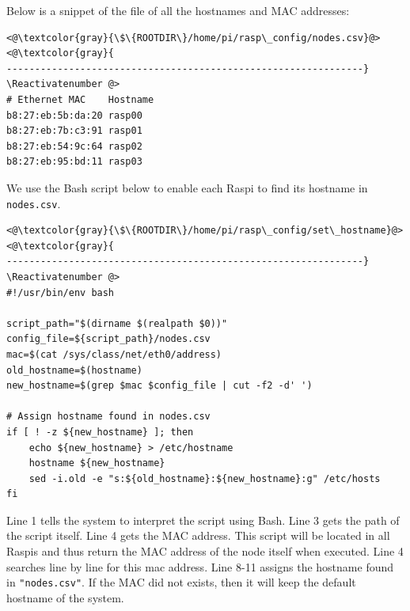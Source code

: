 
Below is a snippet of the file of all the hostnames and \ac{MAC} addresses:



\Suppressnumber\begin{lstlisting}[]
<@\textcolor{gray}{\$\{ROOTDIR\}/home/pi/rasp\_config/nodes.csv}@>
<@\textcolor{gray}{
---------------------------------------------------------------}
\Reactivatenumber @>
# Ethernet MAC    Hostname
b8:27:eb:5b:da:20 rasp00
b8:27:eb:7b:c3:91 rasp01
b8:27:eb:54:9c:64 rasp02
b8:27:eb:95:bd:11 rasp03
\end{lstlisting}
\FloatBarrier
\vspace{-5mm}

We use the \ac{Bash} script below to enable each \ac{Raspi} to find its
hostname in \texttt{nodes.csv}.

\Suppressnumber\begin{lstlisting}[]
<@\textcolor{gray}{\$\{ROOTDIR\}/home/pi/rasp\_config/set\_hostname}@>
<@\textcolor{gray}{
---------------------------------------------------------------}
\Reactivatenumber @>
#!/usr/bin/env bash

script_path="$(dirname $(realpath $0))"
config_file=${script_path}/nodes.csv 
mac=$(cat /sys/class/net/eth0/address)
old_hostname=$(hostname)
new_hostname=$(grep $mac $config_file | cut -f2 -d' ')

# Assign hostname found in nodes.csv
if [ ! -z ${new_hostname} ]; then
    echo ${new_hostname} > /etc/hostname
    hostname ${new_hostname}
    sed -i.old -e "s:${old_hostname}:${new_hostname}:g" /etc/hosts
fi
\end{lstlisting}
\FloatBarrier
\vspace{-5mm}

Line 1 tells the system to interpret the script using Bash. Line 3 gets the
path of the script itself. Line 4 gets the MAC address. This script will be
located in all \ac{Raspi}s and thus return the MAC address of the node itself
when executed.
Line 4 searches line by line for this mac address.
Line 8-11 assigns the hostname found in \texttt{"nodes.csv"}. If the MAC did not exists,
then it will keep the default hostname of the system.

